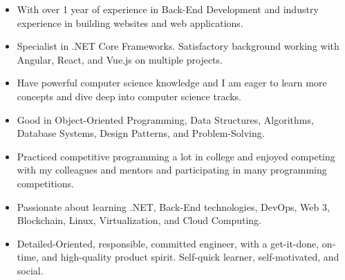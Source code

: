 \documentclass[10pt,a4paper,ragged2e,withhyper]{altacv}
\begin{document}
\begin{paracol}{2}
\begin{itemize}
    \item With over 1 year of experience in Back-End Development and industry experience in building websites and web applications.
    \item Specialist in .NET Core Frameworks. Satisfactory background working with Angular, React, and Vue.js on multiple projects.
    \item Have powerful computer science knowledge and I am eager to learn more concepts and dive deep into computer science tracks.
    \item Good in Object-Oriented Programming, Data Structures, Algorithms, Database Systems, Design Patterns, and Problem-Solving.
    \item Practiced competitive programming a lot in college and enjoyed competing with my colleagues and mentors and participating in many programming competitions.
    \item Passionate about learning .NET, Back-End technologies, DevOps, Web 3, Blockchain, Linux, Virtualization, and Cloud Computing.
    \item Detailed-Oriented, responsible, committed engineer, with a get-it-done, on-time, and high-quality product spirit. Self-quick learner, self-motivated, and social.
\end{itemize}


\\
\\

\divider

\\
\\
\\
\\
\\

\divider

\\
\\
\\
\\
\\
\\
\\
\\
\\


\end{paracol}
\end{document}
